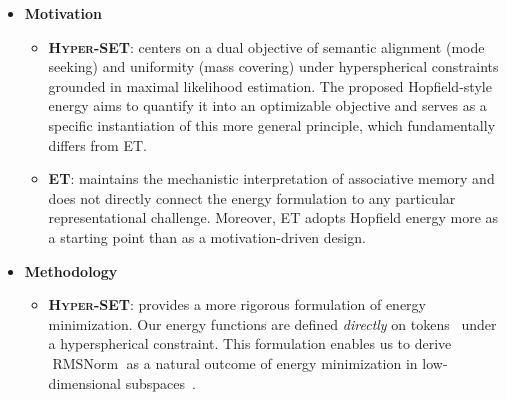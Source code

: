 \begin{itemize}[leftmargin=*]
    \item \textbf{Motivation}
        \begin{itemize}[leftmargin=*]
            \item \textbf{\textsc{Hyper-SET}}: centers on a dual objective of semantic alignment (mode seeking) and uniformity (mass covering) under hyperspherical constraints grounded in maximal likelihood estimation. The proposed Hopfield-style energy aims to quantify it into an optimizable objective and serves as a specific instantiation of this more general principle, which fundamentally differs from \textsc{ET}.
            \item \textbf{\textsc{ET}}: maintains the mechanistic interpretation of associative memory and does not directly connect the energy formulation to any particular representational challenge. Moreover, \textsc{ET} adopts Hopfield energy more as a starting point than as a motivation-driven design.
        \end{itemize}
    \item \textbf{Methodology}
        \begin{itemize}[leftmargin=*]
            \item \textbf{\textsc{Hyper-SET}}: provides a more rigorous formulation of energy minimization. Our energy functions are defined \emph{directly} on tokens~ under a hyperspherical constraint. This formulation enables us to derive $\operatorname{RMSNorm}$ as a natural outcome of energy minimization in low-dimensional subspaces~.


\end{itemize}
\end{itemize}

